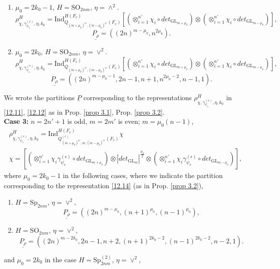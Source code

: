 \documentclass[12pts]{amsart}
\newcommand{\GL}{{\mathrm{GL}}}
\newcommand{\Ind}{{\mathrm{Ind}}}
\newcommand{\SO}{{\mathrm{SO}}}
\newcommand{\Sp}{{\mathrm{Sp}}}
\begin{document}
\begin{enumerate}
	\item $\mu_0=2k_0-1$, $H=\SO_{2nm}$, $\eta=\wedge^2$.
	\begin{equation}\label{12.11}
	\rho^H_{\chi,\gamma_{\psi_v}^{(\epsilon)},\eta,k_0}=\Ind^{H(F_v)}_{Q_{(m+\mu_0)^{n'},(m-\mu_0)^{n'}}(F_v)}[(\otimes_{i=1}^{n'}\chi_i\circ det_{\GL_{m+\mu_0}}) \otimes (\otimes_{i=1}^{n'}\chi_i\circ det_{\GL_{m-\mu_0}})],
	\end{equation}
	$$
	\underline{P_\rho}=((2n)^{m-\mu_0},n^{2\mu_0}).
	$$
	\item $\mu_0=2k_0$, $H=\SO_{2nm}$, $\eta=\vee^2$.
	\begin{equation}\label{12.12}
	\rho^H_{\chi,\gamma_{\psi_v}^{(\epsilon)},\eta,k_0}=\Ind^{H(F_v)}_{Q_{(m+\mu_0)^{n'},(m-\mu_0)^{n'}}(F_v)}[(\otimes_{i=1}^{n'}\chi_i\circ det_{\GL_{m+\mu_0}}) \otimes (\otimes_{i=1}^{n'}\chi_i\circ det_{\GL_{m-\mu_0}})],
	\end{equation}
	$$
		\underline{P_\rho}=((2n)^{m-\mu_0-1},2n-1, n+1, n^{2\mu_0-2},n-1,1).
	$$
	\end{enumerate}
We wrote the partitions $\underline{P}$ corresponding to the representations $\rho^H_{\chi,\gamma_{\psi_v}^{(\epsilon)},\eta,k_0}$ in \eqref{12.11}, \eqref{12.12} as in Prop. \ref{prop 3.1}, Prop. \ref{prop 3.2}. \\
{\bf Case 3:} $n=2n'+1$ is odd, $m=2m'$ is even; $m=\mu_0(n-1)$,
\begin{multline}\label{12.14}
\rho^H_{\chi,\gamma_{\psi_v}^{(\epsilon)},\eta,k_0}=
\Ind^{H(F_v)}_{Q^{(\epsilon)}_{(m+\mu_0)^{n'},m,(m-\mu_0)^{n'}}(F_v)}\chi\\
\chi=[(\otimes_{i=1}^{n'}\chi_i\gamma_{\psi_v}^{(\epsilon)}\circ det_{\GL_{m+\mu_0}}) \otimes |det_{\GL_m}|^{\frac{\mu_0}{2}}\otimes (\otimes_{i=1}^{n'}\chi_i\gamma_{\psi_v}^{(\epsilon)}\circ det_{\GL_{m-\mu_0}})],
\end{multline}
where $\mu_0=2k_0-1$ in the following cases, where we indicate the partition corresponding to the representation \eqref{12.14} (as in Prop. \ref{prop 3.2}),
\begin{enumerate}
	\item $H=\Sp_{2nm}$, $\eta=\vee^2$, 
	$$
	\underline{P_\rho}=((2n)^{m-\mu_0}, (n+1)^{\mu_0},(n-1)^{\mu_0}),
	$$
	\item $H=\SO_{2nm}$, $\eta=\vee^2$,
 $$
 \underline{P_\rho}=((2n)^{m-2k_0},2n-1,n+2,(n+1)^{2k_0-2},(n-1)^{2k_0-2},n-2,1).
 $$
\end{enumerate}
and $\mu_0=2k_0$ in the case $H=\Sp_{2nm}^{(2)}$, $\eta=\vee^2$,
\end{document}
